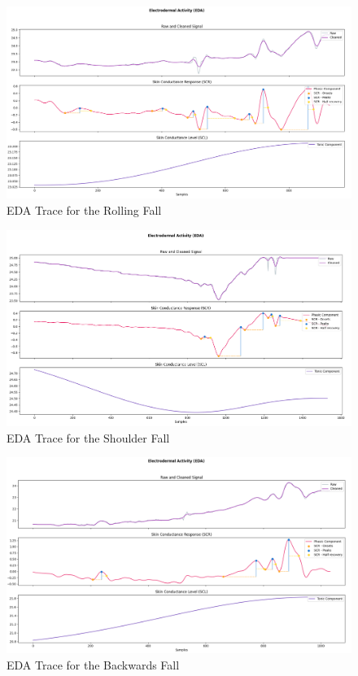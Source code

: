 \begin{figure}[H]
    \centering
    \includegraphics[width=\textwidth]{./images/bitalino/Rolling.png}
    \caption{EDA Trace for the Rolling Fall}
    \label{fig:bitalino-rolling}
\end{figure}

\begin{figure}[H]
    \centering
    \includegraphics[width=\textwidth]{./images/bitalino/Shoulder.png}
    \caption{EDA Trace for the Shoulder Fall}
    \label{fig:bitalino-shoulder}
\end{figure}

\begin{figure}[H]
    \centering
    \includegraphics[width=\textwidth]{./images/bitalino/Backwards.png}
    \caption{EDA Trace for the Backwards Fall}
    \label{fig:bitalino-backwards}
\end{figure}

